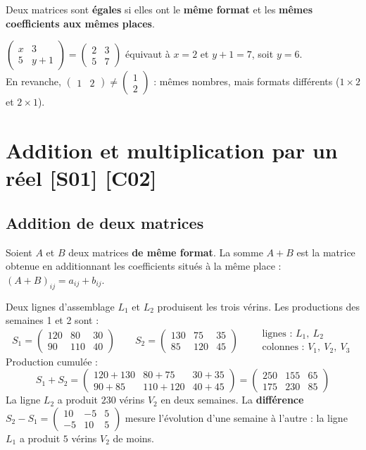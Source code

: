\documentclass[a4paper,11pt]{article}
\newcommand{\M}[1]{\begin{pmatrix}#1\end{pmatrix}}
\begin{document}
\begin{definition}
Deux matrices sont \textbf{égales} si elles ont le \textbf{même format} et les \textbf{mêmes coefficients aux mêmes places}.
\end{definition}

\begin{exemple}[-- Égalité]
$\M{x & 3\\ 5 & y+1} = \M{2 & 3\\ 5 & 7}$ équivaut à $x=2$ et $y+1=7$, soit $y=6$.\\
En revanche, $\M{1 & 2}\neq\M{1\\2}$ : mêmes nombres, mais formats différents ($1\times 2$ et $2\times 1$).
\end{exemple}

\needspace{7cm}
\section{Addition et multiplication par un réel \hfill {\normalsize\color{uimmred}[S01] [C02]}}\label{sec:addition}

\subsection{Addition de deux matrices}\label{subsec:addition}

\begin{definition}[-- Somme]
Soient $A$ et $B$ deux matrices \textbf{de même format}. La somme $A+B$ est la matrice obtenue en additionnant les coefficients situés à la même place : $(A+B)_{ij} = a_{ij} + b_{ij}$.
\end{definition}

\begin{appliindus}\label{ex:addition}
Deux lignes d'assemblage $L_1$ et $L_2$ produisent les trois vérins. Les productions des semaines 1 et 2 sont :
\[
S_1 = \M{120 & 80 & 30\\ 90 & 110 & 40}
\qquad
S_2 = \M{130 & 75 & 35\\ 85 & 120 & 45}
\qquad
\begin{array}{l}\text{lignes : } L_1,\ L_2\\ \text{colonnes : } V_1,\ V_2,\ V_3\end{array}
\]
Production cumulée :
\[
S_1+S_2 = \M{120+130 & 80+75 & 30+35\\ 90+85 & 110+120 & 40+45} = \M{250 & 155 & 65\\ 175 & 230 & 85}
\]
La ligne $L_2$ a produit $230$ vérins $V_2$ en deux semaines. La \textbf{différence} $S_2-S_1 = \M{10 & -5 & 5\\ -5 & 10 & 5}$ mesure l'évolution d'une semaine à l'autre : la ligne $L_1$ a produit $5$ vérins $V_2$ de moins.
\end{appliindus}
\end{document}
